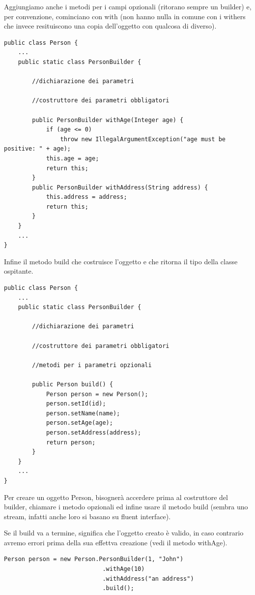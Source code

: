 Aggiungiamo anche i metodi per i campi opzionali (ritorano sempre un builder) e, per convenzione, cominciano con with (non hanno nulla in comune con i withers
che invece resituiscono una copia dell'oggetto con qualcosa di diverso).

\begin{lstlisting}
public class Person {
    ...
    public static class PersonBuilder {
        
        //dichiarazione dei parametri
        
        //costruttore dei parametri obbligatori
        
        public PersonBuilder withAge(Integer age) {
            if (age <= 0)
                throw new IllegalArgumentException("age must be positive: " + age);
            this.age = age;
            return this;
        }
        public PersonBuilder withAddress(String address) {
            this.address = address;
            return this;
        }
    }
    ...
}       
\end{lstlisting}

Infine il metodo build che costruisce l’oggetto e che ritorna il tipo della classe ospitante.

\begin{lstlisting}
public class Person {
    ...
    public static class PersonBuilder {
        
        //dichiarazione dei parametri
        
        //costruttore dei parametri obbligatori
        
        //metodi per i parametri opzionali

        public Person build() {
            Person person = new Person();
            person.setId(id);
            person.setName(name);
            person.setAge(age);
            person.setAddress(address);
            return person;
        }
    }
    ...
} 
\end{lstlisting}

Per creare un oggetto Person, bisognerà accerdere prima al costruttore del builder, chiamare i metodo opzionali ed infine usare il metodo build 
(sembra uno stream, infatti anche loro si basano su fluent interface).

Se il build va a termine, significa che l'oggetto creato è valido, in caso contrario avremo errori prima della sua effettva creazione (vedi il metodo withAge).

\begin{lstlisting}
Person person = new Person.PersonBuilder(1, "John")
                            .withAge(10)
                            .withAddress("an address")
                            .build();
\end{lstlisting}